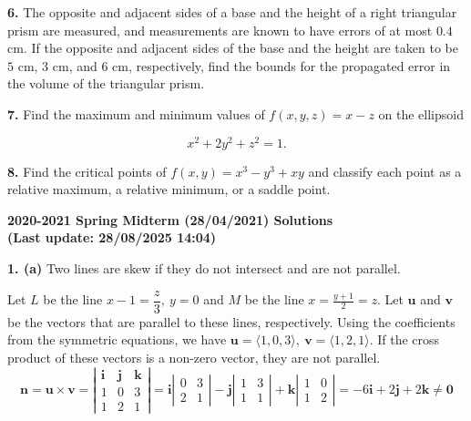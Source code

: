 \documentclass{article}
\begin{document}
\textbf{6.} The opposite and adjacent sides of a base and the height of a right triangular prism are measured, and measurements are known to have errors of at most $0.4$ cm. If the opposite and adjacent sides of the base and the height are taken to be $5$ cm, $3$ cm, and $6$ cm, respectively, find the bounds for the propagated error in the volume of the triangular prism.

\vspace{1em}

\textbf{7.} Find the maximum and minimum values of $f(x,y,z)=x-z$ on the ellipsoid

\[x^2+2y^2+z^2=1.\]

\vspace{1em}

\textbf{8.} Find the critical points of $f(x,y)=x^3-y^3+xy$ and classify each point as a relative maximum, a relative minimum, or a saddle point.

\newpage

\begin{center}
\textbf{2020-2021 Spring Midterm (28/04/2021) Solutions\\
(Last update: 28/08/2025 14:04)}
\end{center}

\textbf{1. (a)} Two lines are skew if they do not intersect and are not parallel.

Let $L$ be the line $x-1=\dfrac z3,\: y=0$  and $M$ be the line $\displaystyle x=\frac{y+1}2=z$. Let $\mathbf u$ and $\mathbf v$ be the vectors that are parallel to these lines, respectively. Using the coefficients from the symmetric equations, we have $\mathbf u=\langle1,0,3\rangle, \:\mathbf v= \langle1,2,1\rangle$. If the cross product of these vectors is a non-zero vector, they are not parallel.
\[\mathbf{n}=\mathbf{u}\times\mathbf{v}=\left|\begin{array}{ccc}
\mathbf{i}&\mathbf{j}&\mathbf{k}\\
1&0&3\\
1&2&1
\end{array}\right|=\mathbf{i}\left|\begin{array}{cc}
0&3\\2&1
\end{array}\right|-\mathbf{j}\left|\begin{array}{cc}
1&3\\1&1
\end{array}\right|+\mathbf{k}\left|\begin{array}{cc}
1&0\\1&2
\end{array}\right|=-6\mathbf{i}+2\mathbf{j}+2\mathbf{k}\neq\mathbf{0}\]
\end{document}

